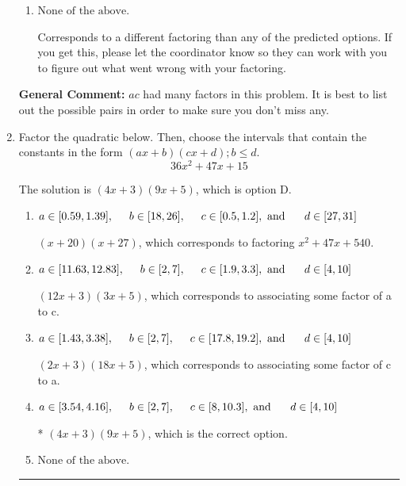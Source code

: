 \documentclass{extbook}[14pt]
\newcommand{\litem}[1]{\item #1

\rule{\textwidth}{0.4pt}}
\begin{document}
\begin{enumerate}
{\begin{enumerate}[label=\Alph*.]
 $(x -27)(x + 20)$, which corresponds to factoring $x^{2} -7 x -540$.
\item \( \text{None of the above.} \)

 Corresponds to a different factoring than any of the predicted options. If you get this, please let the coordinator know so they can work with you to figure out what went wrong with your factoring.
\end{enumerate}

\textbf{General Comment:} $ac$ had many factors in this problem. It is best to list out the possible pairs in order to make sure you don't miss any.
}
\litem{
Factor the quadratic below. Then, choose the intervals that contain the constants in the form $(ax+b)(cx+d); b \leq d.$
\[ 36x^{2} +47 x + 15 \]

The solution is \( (4x + 3)(9x + 5) \), which is option D.\begin{enumerate}[label=\Alph*.]
\item \( a \in [0.59, 1.39], \hspace*{5mm} b \in [18, 26], \hspace*{5mm} c \in [0.5, 1.2], \text{ and } \hspace*{5mm} d \in [27, 31] \)

 $(x + 20)(x + 27)$, which corresponds to factoring $x^{2} +47 x + 540$.
\item \( a \in [11.63, 12.83], \hspace*{5mm} b \in [2, 7], \hspace*{5mm} c \in [1.9, 3.3], \text{ and } \hspace*{5mm} d \in [4, 10] \)

 $(12x + 3)(3x + 5)$, which corresponds to associating some factor of a to c.
\item \( a \in [1.43, 3.38], \hspace*{5mm} b \in [2, 7], \hspace*{5mm} c \in [17.8, 19.2], \text{ and } \hspace*{5mm} d \in [4, 10] \)

 $(2x + 3)(18x + 5)$, which corresponds to associating some factor of c to a.
\item \( a \in [3.54, 4.16], \hspace*{5mm} b \in [2, 7], \hspace*{5mm} c \in [8, 10.3], \text{ and } \hspace*{5mm} d \in [4, 10] \)

* $(4x + 3)(9x + 5)$, which is the correct option.
\item \( \text{None of the above.} \)


\end{enumerate}}
\end{enumerate}
\end{document}
